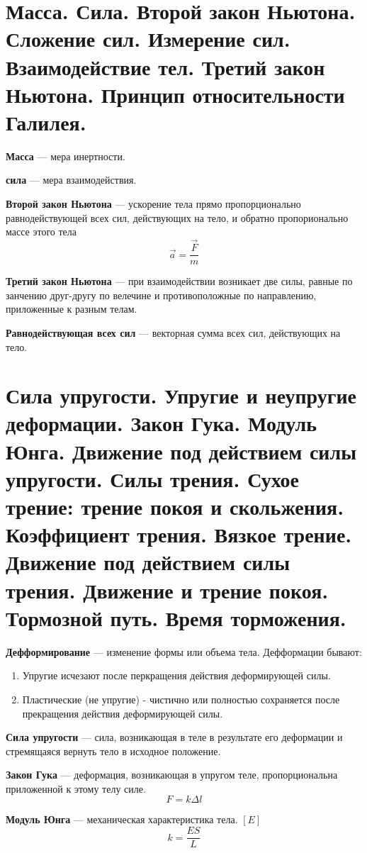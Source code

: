 \documentclass{report}
\begin{document}
\part{ Масса. 
Сила. 
Второй закон Ньютона. 
Сложение сил. 
Измерение сил. 
Взаимодействие тел. 
Третий закон Ньютона. 
Принцип относительности Галилея.}

{\bf Масса} ---
мера инертности.

{\bf сила} ---
мера взаимодействия.

{\bf Второй закон Ньютона} ---
ускорение тела прямо пропорционально равнодействующей всех сил, действующих на тело, и обратно
пропорионально массе этого тела
$$
\vec{a}=\frac{\vec{F}}{m}
$$

{\bf Третий закон Ньютона} ---
при взаимодействии возникает две силы, равные по занчению друг-другу по велечине и противоположные
по направлению, приложенные к разным телам.

{\bf Равнодействующая всех сил} ---
векторная сумма всех сил, действующих на тело.



\part{Сила упругости. 
Упругие и неупругие деформации. 
Закон Гука. 
Модуль Юнга. 
Движение под действием силы упругости. 
Силы трения. 
Сухое трение: трение покоя и скольжения. 
Коэффициент трения. 
Вязкое трение. 
Движение под действием силы трения. 
Движение и трение покоя. 
Тормозной путь. 
Время торможения.}

{\bf Дефформирование} ---
изменение формы или объема тела. Дефформации бывают:
\begin{enumerate}
  \item Упругие исчезают после перкращения действия деформирующей силы.
  \item Пластические (не упругие) - чистично или полностью сохраняется после прекращения действия 
  деформирующей силы.
\end{enumerate}

{\bf Сила упругости} ---
сила, возникающая в теле в результате его деформации и стремящаяся вернуть тело в исходное положение.

{\bf Закон Гука} ---
деформация, возникающая в упругом теле, пропорциональна приложенной к этому телу силе.
$$
F=k\Delta l
$$

{\bf Модуль Юнга} ---
механическая характеристика тела. $[E]$
$$
k=\frac{ES}{L}
$$
\end{document}
